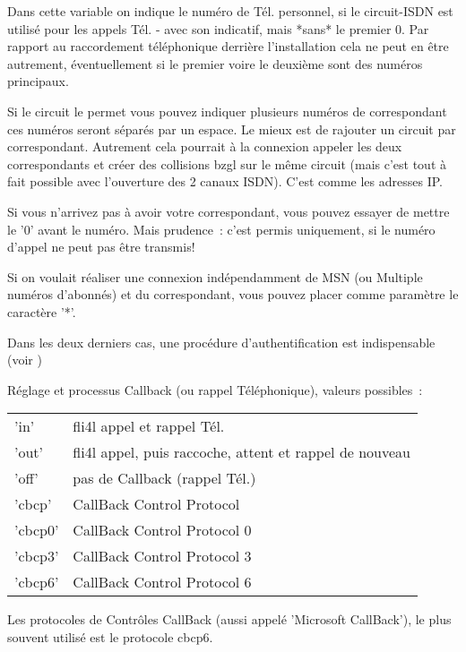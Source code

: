 \begin{description}
  Dans cette variable  on indique le numéro
  de Tél. personnel, si le circuit-ISDN est utilisé pour les appels Tél. -
  avec son indicatif, mais *sans* le premier 0. Par rapport au raccordement
  téléphonique derrière l'installation cela ne peut en être autrement,
  éventuellement si le premier voire le deuxième sont des numéros principaux.

  Si le circuit le permet vous pouvez indiquer plusieurs numéros de correspondant
  ces numéros seront séparés par un espace. Le mieux est de rajouter un circuit
  par correspondant. Autrement cela pourrait à la connexion appeler les deux
  correspondants et créer des collisions bzgl sur le même circuit (mais c'est
  tout à fait possible avec l'ouverture des 2 canaux ISDN). C'est comme les
  adresses IP.

  Si vous n'arrivez pas à avoir votre correspondant, vous pouvez essayer de mettre
  le '0' avant le numéro. Mais prudence~: c'est permis uniquement, si le numéro
  d'appel ne peut pas être transmis!

  Si on voulait réaliser une connexion indépendamment de MSN (ou Multiple numéros
  d'abonnés) et du correspondant, vous pouvez placer comme paramètre le caractère '*'.

  Dans les deux derniers cas, une procédure d'authentification est indispensable
  (voir )


  Réglage et processus Callback (ou rappel Téléphonique), valeurs possibles~:

  \begin{tabular}[h!]{ll}
        'in' &     fli4l appel et rappel Tél.\\
        'out' &    fli4l appel, puis raccoche, attent et rappel de nouveau\\
        'off' &    pas de Callback (rappel Tél.)\\
        'cbcp' &   CallBack Control Protocol\\
        'cbcp0' &  CallBack Control Protocol 0\\
        'cbcp3' &  CallBack Control Protocol 3\\
        'cbcp6' &  CallBack Control Protocol 6\\
  \end{tabular}

  Les protocoles de Contrôles CallBack (aussi appelé 'Microsoft CallBack'),
  le plus souvent utilisé est le protocole cbcp6.


\end{description}
